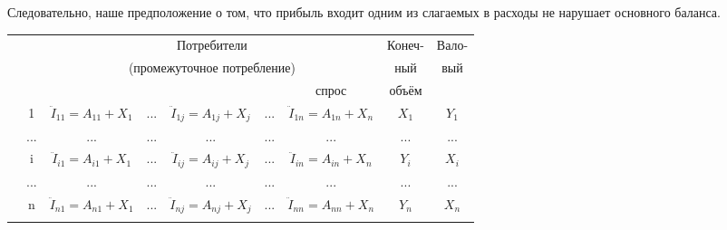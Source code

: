 \documentclass[12pt, 4paper]{book}
\begin{document}
{Следовательно, наше предположение о том, что прибыль входит одним из слагаемых в расходы не нарушает основного баланса.
\newpage
\begin{table}[h]
	\centering
	\begin{tabular}[center]{|p{0.2in}|p{0.2in}|p{1in}|p{0.2in}|p{1in}|p{0.2in}|p{1in}|p{0.3in}|p{0.3in}|}
	\hline
	\multicolumn{2}{|c|}{\multirow{2}{*}{}} & \multicolumn{5}{c|}{{\small Потребители}} &\multicolumn{1}{c|}{{\small Конеч-}} & \multicolumn{1}{c|}{{\small Вало-}}  \\
	\multicolumn{2}{|c|}{\multirow{2}{*}{}} & \multicolumn{5}{c|}{{\small (промежуточное потребление)}} & \multicolumn{1}{c|}{{\small ный}} & \multicolumn{1}{c|}{{\small вый}} \\ \hhline{~~-----~} 
	\multicolumn{2}{|c|}{\multirow{2}{*}{}} & \centering {1} & \centering {...} & \centering {j} & \centering {...}  & \centering {n} & \multicolumn{1}{c|}{{\small спрос}} & \multicolumn{1}{c|}{{\small объём}}\\ \hline
	\multicolumn{1}{|c|}{} & \multicolumn{1}{c|}{1}  & \multicolumn{1}{c|}{{\small $\ddot{I}_{11} = A_{11} + X_1$}} & \multicolumn{1}{c|}{...} & \multicolumn{1}{c|}{{\small $\ddot{I}_{1j} = A_{1j} + X_j$}} & \multicolumn{1}{c|}{...} & \multicolumn{1}{c|}{{\small $\ddot{I}_{1n} = A_{1n} + X_n$}}& \multicolumn{1}{c|}{{\small $X_1$}} & \multicolumn{1}{c|}{{\small $Y_1$}}\\  \hhline{~--------}
	\multicolumn{1}{|c|}{} & \multicolumn{1}{c|}{...}  & \multicolumn{1}{c|}{...} & \multicolumn{1}{c|}{...} & \multicolumn{1}{c|}{...} & \multicolumn{1}{c|}{...} & \multicolumn{1}{c|}{...}& \multicolumn{1}{c|}{...} & \multicolumn{1}{c|}{...}\\  \hhline{~--------}
	\multicolumn{1}{|c|}{} & \multicolumn{1}{c|}{i}  & \multicolumn{1}{c|}{{\small $\ddot{I}_{i1} = A_{i1} + X_1$}} & \multicolumn{1}{c|}{...} & \multicolumn{1}{c|}{{\small $\ddot{I}_{ij} = A_{ij} + X_j$}} & \multicolumn{1}{c|}{...} & \multicolumn{1}{c|}{{\small $\ddot{I}_{in} = A_{in} + X_n$}}& \multicolumn{1}{c|}{$Y_i$} & \multicolumn{1}{c|}{$X_i$}\\  \hhline{~--------} 
	\multicolumn{1}{|c|}{} & \multicolumn{1}{c|}{...}  & \multicolumn{1}{c|}{...} & \multicolumn{1}{c|}{...} & \multicolumn{1}{c|}{...} & \multicolumn{1}{c|}{...} & \multicolumn{1}{c|}{...}& \multicolumn{1}{c|}{...} & \multicolumn{1}{c|}{...}\\  \hhline{~--------} 
	\multicolumn{1}{|c|}{} & \multicolumn{1}{c|}{n}  & \multicolumn{1}{c|}{{\small $\ddot{I}_{n1} = A_{n1} + X_1$}} & \multicolumn{1}{c|}{...} & \multicolumn{1}{c|}{{\small $\ddot{I}_{nj} = A_{nj} + X_j$}} & \multicolumn{1}{c|}{...} & \multicolumn{1}{c|}{{\small $\ddot{I}_{nn} = A_{nn} + X_n$}}& \multicolumn{1}{c|}{$Y_n$} & \multicolumn{1}{c|}{$X_n$}\\ \hhline{---------} 

\end{tabular}
\end{table}}
\end{document}
